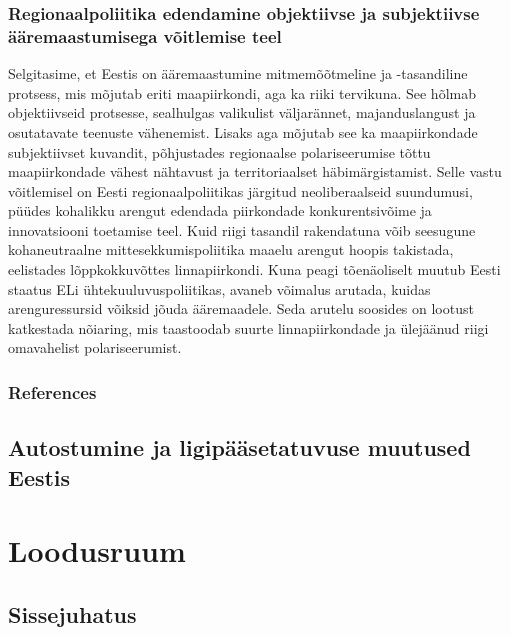 \documentclass[]{book}
\begin{document}
\hypertarget{regionaalpoliitika-edendamine-objektiivse-ja-subjektiivse-aaremaastumisega-voitlemise-teel}{%
\subsection{Regionaalpoliitika edendamine objektiivse ja subjektiivse ääremaastumisega võitlemise teel}\label{regionaalpoliitika-edendamine-objektiivse-ja-subjektiivse-aaremaastumisega-voitlemise-teel}}

Selgitasime, et Eestis on ääremaastumine mitmemõõtmeline ja -tasandiline protsess, mis mõjutab eriti maapiirkondi, aga ka riiki tervikuna. See hõlmab objektiivseid protsesse, sealhulgas valikulist väljarännet, majanduslangust ja osutatavate teenuste vähenemist. Lisaks aga mõjutab see ka maapiirkondade subjektiivset kuvandit, põhjustades regionaalse polariseerumise tõttu maapiirkondade vähest nähtavust ja territoriaalset häbimärgistamist. Selle vastu võitlemisel on Eesti regionaalpoliitikas järgitud neoliberaalseid suundumusi, püüdes kohalikku arengut edendada piirkondade konkurentsivõime ja innovatsiooni toetamise teel. Kuid riigi tasandil rakendatuna võib seesugune kohaneutraalne mittesekkumispoliitika maaelu arengut hoopis takistada, eelistades lõppkokkuvõttes linnapiirkondi. Kuna peagi tõenäoliselt muutub Eesti staatus ELi ühtekuuluvuspoliitikas, avaneb võimalus arutada, kuidas arenguressursid võiksid jõuda ääremaadele. Seda arutelu soosides on lootust katkestada nõiaring, mis taastoodab suurte linnapiirkondade ja ülejäänud riigi omavahelist polariseerumist.

\hypertarget{references}{%
\subsection*{References}\label{references}}

\hypertarget{regionaal_2.5}{%
\section{Autostumine ja ligipääsetatuvuse muutused Eestis}\label{regionaal_2.5}}

\hypertarget{chapter3}{%
\chapter{Loodusruum}\label{chapter3}}

\hypertarget{sissejuhatus-3}{%
\section*{Sissejuhatus}\label{sissejuhatus-3}}
\end{document}
